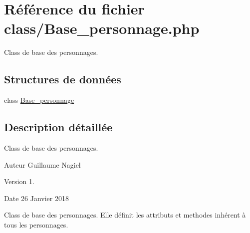 \hypertarget{_base__personnage_8php}{}\section{Référence du fichier class/\+Base\+\_\+personnage.php}
\label{_base__personnage_8php}


Class de base des personnages.  


\subsection*{Structures de données}
\begin{DoxyCompactItemize}
\item 
class \mbox{\hyperlink{class_base__personnage}{Base\+\_\+personnage}}
\end{DoxyCompactItemize}


\subsection{Description détaillée}
Class de base des personnages. 

\begin{DoxyAuthor}{Auteur}
Guillaume Nagiel 
\end{DoxyAuthor}
\begin{DoxyVersion}{Version}
1. 
\end{DoxyVersion}
\begin{DoxyDate}{Date}
26 Janvier 2018
\end{DoxyDate}
Class de base des personnages. Elle définit les attributs et methodes inhérent à tous les personnages. 